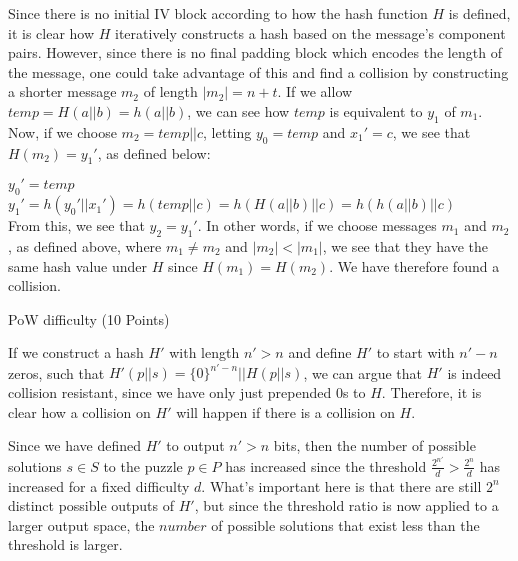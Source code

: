 \documentclass[12pt]{article}
\newenvironment{question}[2][Question]{\begin{trivlist}
\item[\hskip \labelsep {\bfseries #1}\hskip \labelsep {\bfseries #2.}]}{\end{trivlist}}
\begin{document}
\begin{enumerate}
    Since there is no initial IV block according to how the hash function $H$ is defined, it is clear how $H$ iteratively constructs a hash based on the message's component pairs. However, since there is no final padding block which encodes the length of the message, one could take advantage of this and find a collision by constructing a shorter message $m_2$ of length $|m_2|=n+t$. If we allow $temp=H(a||b)=h(a||b)$, we can see how $temp$ is equivalent to $y_1$ of $m_1$. Now, if we choose $m_2=temp||c$, letting $y_0=temp$ and $x_1'=c$, we see that $H(m_2)=y_1'$, as defined below:

    $y_0'=temp$\\
    $y_1'=h(y_0'||x_1')=h(temp||c)=h(H(a||b)||c)=h(h(a||b)||c)$\\

    From this, we see that $y_2 = y_1'$. In other words, if we choose messages $m_1$ and $m_2$, as defined above, where $m_1 \not = m_2$ and $|m_2|<|m_1|$, we see that they have the same hash value under $H$ since $H(m_1)=H(m_2)$. We have therefore found a collision.
    
\end{enumerate}
















\begin{question}{4}{PoW difficulty (10 Points)} %
\end{question}


If we construct a hash $H'$ with length $n'>n$ and define $H'$ to start with $n'-n$ zeros, such that $H'(p||s) = \{0\}^{n'-n} || H(p||s)$, we can argue that $H'$ is indeed collision resistant, since we have only just prepended $0$s to $H$. Therefore, it is clear how a collision on $H'$ will happen if there is a collision on $H$.

Since we have defined $H'$ to output $n'>n$ bits, then the number of possible solutions $s \in S$ to the puzzle $p \in P$ has increased since the threshold $\frac{2^{n'}}{d} > \frac{2^n}{d}$ has increased for a fixed difficulty $d$. What's important here is that there are still $2^n$ distinct possible outputs of $H'$, but since the threshold ratio is now applied to a larger output space, the $\textit{number}$ of possible solutions that exist less than the threshold is larger.
\end{document}
